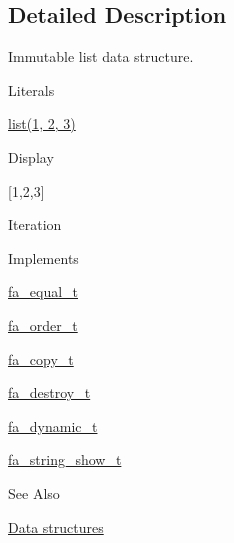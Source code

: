 \subsection{Detailed Description}
Immutable list data structure. \begin{DoxyParagraph}{Literals}

\begin{DoxyItemize}
\item {\ttfamily \hyperlink{literals_8h_a4ddd63dfcfec2b4d5741a56aa6003c76}{list(1, 2, 3)}}
\end{DoxyItemize}
\end{DoxyParagraph}
\begin{DoxyParagraph}{Display}

\begin{DoxyItemize}
\item {\ttfamily \mbox{[}1,2,3\mbox{]}}
\end{DoxyItemize}
\end{DoxyParagraph}
\begin{DoxyParagraph}{Iteration}


\end{DoxyParagraph}
\begin{DoxyParagraph}{Implements}

\begin{DoxyItemize}
\item \hyperlink{structfa__equal__t}{fa\-\_\-equal\-\_\-t}
\item \hyperlink{structfa__order__t}{fa\-\_\-order\-\_\-t}
\item \hyperlink{structfa__copy__t}{fa\-\_\-copy\-\_\-t}
\item \hyperlink{structfa__destroy__t}{fa\-\_\-destroy\-\_\-t}
\item \hyperlink{structfa__dynamic__t}{fa\-\_\-dynamic\-\_\-t}
\item \hyperlink{structfa__string__show__t}{fa\-\_\-string\-\_\-show\-\_\-t}
\end{DoxyItemize}
\end{DoxyParagraph}
\begin{DoxySeeAlso}{See Also}

\begin{DoxyItemize}
\item \hyperlink{md__data_structures_DataStructures}{Data structures} 
\end{DoxyItemize}
\end{DoxySeeAlso}



